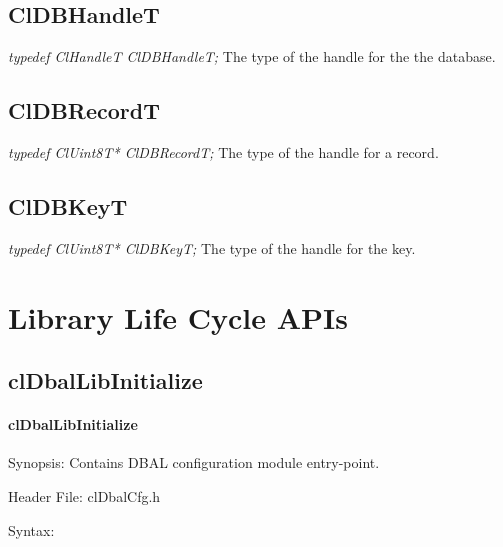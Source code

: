 \begin{flushleft}
\subsection{ClDBHandleT}
\textit{typedef ClHandleT ClDBHandleT;}
\newline
\newline
The type of the handle for the the database.


\subsection{ClDBRecordT}
\textit{typedef ClUint8T* ClDBRecordT;}
\newline
\newline
The type of the handle for a record.


\subsection{ClDBKeyT}
\textit{typedef ClUint8T* ClDBKeyT;}
\newline
\newline
The type of the  handle for the key.

\newpage

\section{Library Life Cycle APIs}
\subsection{clDbalLibInitialize}
\hypertarget{pagedbal201}{}\paragraph{cl\-Dbal\-Lib\-Initialize}\label{pagedbal201}
\begin{Desc}
\item[Synopsis:]Contains DBAL configuration module entry-point.\end{Desc}
\begin{Desc}
\item[Header File:]clDbalCfg.h\end{Desc}
\begin{Desc}
\item[Syntax:]


\end{Desc}
\end{flushleft}
